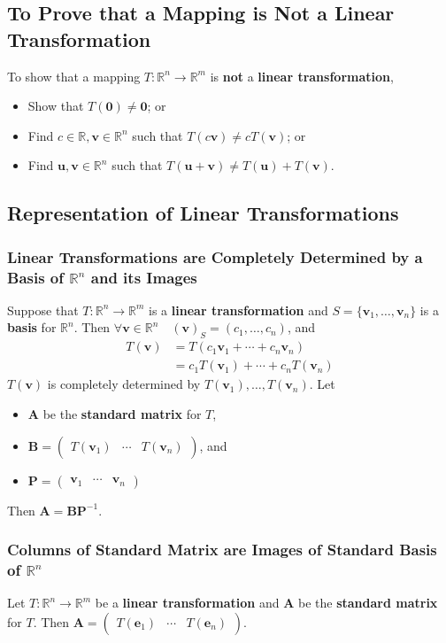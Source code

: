 \documentclass[../ma2001_notes.tex]{subfiles}
\begin{document}
\subsection{To Prove that a Mapping is Not a Linear Transformation}
To show that a mapping \(T:\mathbb{R}^n\to\mathbb{R}^m\) is \textbf{not} a \textbf{linear transformation},
\begin{itemize}
	\item Show that \(T(\bm{0})\ne\bm{0}\); or
	\item Find \(c\in\mathbb{R},\bm{v}\in\mathbb{R}^n\) such that \(T(c\bm{v})\ne cT(\bm{v})\); or
	\item Find \(\bm{u},\bm{v}\in\mathbb{R}^n\) such that \(T(\bm{u}+\bm{v})\ne T(\bm{u})+T(\bm{v})\).
\end{itemize}

\subsection{Representation of Linear Transformations}
\subsubsection{Linear Transformations are Completely Determined by a Basis of $\mathbb{R}^n$ and its Images}
Suppose that \(T:\mathbb{R}^n\to\mathbb{R}^m\) is a \textbf{linear transformation} and \(S=\{\bm{v}_1,\ldots,\bm{v}_n\}\) is a \textbf{basis} for \(\mathbb{R}^n\). Then \(\forall\bm{v}\in\mathbb{R}^n\quad(\bm{v})_S=(c_1,\ldots,c_n)\), and
\begin{align*}
	T(\bm{v})
	&=T(c_1\bm{v}_1+\cdots+c_n\bm{v}_n) \\
	&=c_1T(\bm{v}_1)+\cdots+c_nT(\bm{v}_n)
\end{align*}
\(T(\bm{v})\) is completely determined by \(T(\bm{v}_1),\ldots,T(\bm{v}_n)\). Let
\begin{itemize}
	\item\(\bm{A}\) be the \textbf{standard matrix} for \(T\),
	\item\(\bm{B}=\begin{pmatrix}
		T(\bm{v}_1) & \cdots & T(\bm{v}_n)
	\end{pmatrix}\), and
	\item\(\bm{P}=\begin{pmatrix}
		\bm{v}_1 & \cdots & \bm{v}_n
	\end{pmatrix}\)
\end{itemize}
Then \(\bm{A}=\bm{BP}^{-1}\).

\subsubsection{Columns of Standard Matrix are Images of Standard Basis of $\mathbb{R}^n$}
Let \(T:\mathbb{R}^n\to\mathbb{R}^m\) be a \textbf{linear transformation} and \(\bm{A}\) be the \textbf{standard matrix} for \(T\). Then \(\bm{A}=\begin{pmatrix}
	T(\bm{e}_1) & \cdots & T(\bm{e}_n)
\end{pmatrix}\).
\end{document}
